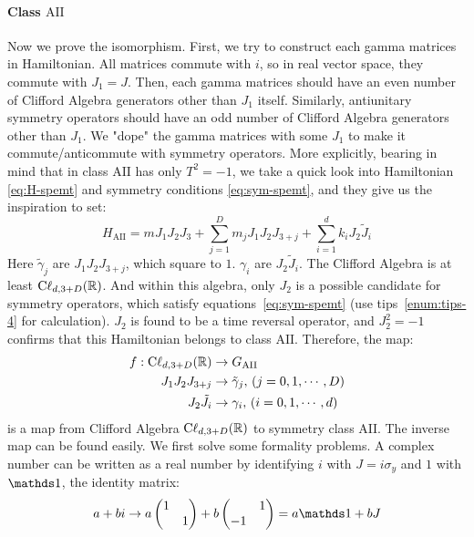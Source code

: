 \documentclass{article}
\begin{document}
\paragraph{Class $\mathrm{AII}$} Now we prove the isomorphism. First, we try to
construct each gamma matrices in Hamiltonian. All matrices commute with $i$, so
in real vector space, they commute with $J_1=J$. Then, each gamma matrices
should have an even number of Clifford Algebra generators other than $J_1$
itself. Similarly, antiunitary symmetry operators should have an odd number of
Clifford Algebra generators other than $J_1$. We "dope" the gamma matrices with
some $J_1$ to make it commute/anticommute with symmetry operators. More
explicitly, bearing in mind that in class $\mathrm{AII}$ has only $T^2=-1$, we
take a quick look into Hamiltonian \ref{eq:H-spemt} and symmetry conditions
\ref{eq:sym-spemt}, and they give us the inspiration to set:
\begin{equation}
    H_{\mathrm{AII}} = m J_1J_2J_3 + \sum_{j=1}^D m_jJ_1J_2J_{3+j} +
    \sum_{i=1}^d k_i J_2\tilde{J}_i
\end{equation}
Here $\tilde{\gamma}_j$ are $J_1J_2J_{3+j}$, which square to $1$. $\gamma_i$ are
$J_2\tilde{J}_i$. The Clifford Algebra is at least $\mathrm{C\ell}_{d,3+D}(\mathbb{R})$.
And within this algebra, only $J_2$ is a possible candidate for symmetry
operators, which satisfy equations~\ref{eq:sym-spemt} (use
tips~\ref{enum:tips-4} for calculation). $J_2$ is found to be a
time reversal operator, and $J_2^2=-1$ confirms that this Hamiltonian belongs to
class $\mathrm{AII}$. Therefore, the map:
\begin{align}
    f: \mathrm{C\ell}_{d,3+D}(\mathbb{R}) &\to G_{\mathrm{AII}} \\
    J_1J_2J_{3+j} &\to \tilde{\gamma}_j,\, (j=0,1,\cdots,D) \nonumber\\
    J_2 \tilde{J}_i &\to \gamma_i,\, (i=0,1,\cdots,d) \nonumber
\end{align}
is a map from Clifford Algebra $\mathrm{C\ell}_{d,3+D}(\mathbb{R})$ to symmetry class
$\mathrm{AII}$. The inverse map can be found easily. We first solve some
formality problems. A complex number can be written as a real number by
identifying $i$ with $J=i\sigma_y$ and $1$ with $\id$, the identity matrix:
\begin{equation}
    a+bi \to a \begin{pmatrix}
        1 & \\ & 1
    \end{pmatrix} + b \begin{pmatrix}
         & 1 \\ -1 & 
    \end{pmatrix} = a\id + b J
\end{equation}
\end{document}
